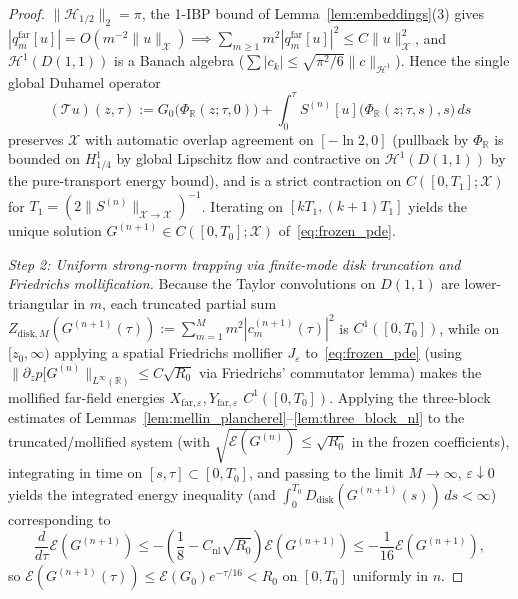 \documentclass[11pt,a4paper]{article}
\begin{document}
\begin{proof}
$\|\mathcal{H}_{1/2}\|_2=\pi$, the 1-IBP bound of Lemma~\ref{lem:embeddings}(3) gives
$|q_m^{\mathrm{far}}[u]|=O(m^{-2}\|u\|_{\mathcal{X}})\implies \sum_{m\ge 1} m^2|q_m^{\mathrm{far}}[u]|^2\le C\|u\|_{\mathcal{X}}^2$,
and $\mathcal{H}^1(D(1,1))$ is a Banach algebra ($\sum|c_k|\le\sqrt{\pi^2/6}\|c\|_{\mathcal{H}^1}$).
Hence the single global Duhamel operator
\[
(\mathcal{T} u)(z,\tau) := G_0\bigl(\Phi_{\mathbb{R}}(z;\tau,0)\bigr) + \int_0^\tau S^{(n)}[u]\bigl(\Phi_{\mathbb{R}}(z;\tau,s),s\bigr)\,ds
\]
preserves $\mathcal{X}$ with automatic overlap agreement on $[-\ln 2,0]$ (pullback by $\Phi_{\mathbb{R}}$ is bounded on $H^1_{1/4}$
by global Lipschitz flow and contractive on $\mathcal{H}^1(D(1,1))$ by the pure-transport energy bound),
and is a strict contraction on $C([0,T_1];\mathcal{X})$ for $T_1=(2\|S^{(n)}\|_{\mathcal{X}\to\mathcal{X}})^{-1}$.
Iterating on $[k T_1,(k+1)T_1]$ yields the unique solution $G^{(n+1)}\in C([0,T_0];\mathcal{X})$ of~\eqref{eq:frozen_pde}.

\emph{Step 2: Uniform strong-norm trapping via finite-mode disk truncation and Friedrichs mollification.}
Because the Taylor convolutions on $D(1,1)$ are lower-triangular in $m$, each truncated partial sum
$Z_{\mathrm{disk},M}(G^{(n+1)}(\tau)):=\sum_{m=1}^M m^2|c_m^{(n+1)}(\tau)|^2$ is $C^1([0,T_0])$, while on $[z_0,\infty)$
applying a spatial Friedrichs mollifier $J_\varepsilon$ to~\eqref{eq:frozen_pde} (using $\|\partial_z p[G^{(n)}\|_{L^\infty(\mathbb{R})}\le C\sqrt{R_0}$
via Friedrichs' commutator lemma) makes the mollified far-field energies $X_{\mathrm{far},\varepsilon},Y_{\mathrm{far},\varepsilon}$
$C^1([0,T_0])$. Applying the three-block estimates of Lemmas~\ref{lem:mellin_plancherel}--\ref{lem:three_block_nl} to the
truncated/mollified system (with $\sqrt{\mathcal{E}(G^{(n)})}\le\sqrt{R_0}$ in the frozen coefficients), integrating in time on
$[s,\tau]\subset[0,T_0]$, and passing to the limit $M\to\infty$, $\varepsilon\downarrow 0$ yields the integrated energy inequality
(and $\int_0^{T_0}D_{\mathrm{disk}}(G^{(n+1)}(s))\,ds<\infty$) corresponding to
\[
\frac{d}{d\tau}\mathcal{E}(G^{(n+1)}) \le -\left(\frac{1}{8} - C_{\mathrm{nl}}\sqrt{R_0}\right)\mathcal{E}(G^{(n+1)}) \le -\frac{1}{16}\mathcal{E}(G^{(n+1)}),
\]
so $\mathcal{E}(G^{(n+1)}(\tau))\le\mathcal{E}(G_0)e^{-\tau/16}<R_0$ on $[0,T_0]$ uniformly in $n$.


\end{proof}
\end{document}
